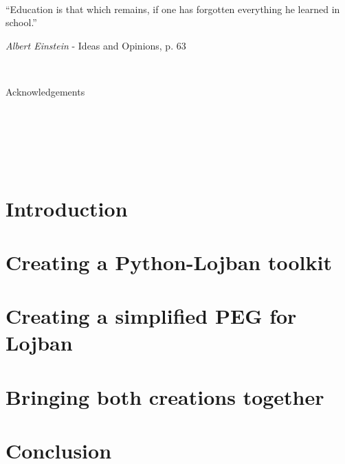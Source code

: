 

\newpage \ \newpage

\renewcommand{\epigraphsize}{\large}
\renewcommand{\epigraphwidth}{10cm}
\vspace{3cm}
\epigraph{``Education is that which remains, if one has forgotten everything he learned in school.''}{\textit{Albert Einstein} - Ideas and Opinions, p. 63}

\newpage \ \newpage

Acknowledgements

\newpage \ \newpage

\vspace{-1cm}
\setcounter{tocdepth}{3}
\tableofcontents
\newpage \ \newpage
\listoffigures
\newpage \ \newpage %

\makeatletter
\@openrightfalse
\makeatother
\pagestyle{fancy}
\part{Introduction}


\part{Creating a Python-Lojban toolkit}

\part{Creating a simplified PEG for Lojban}

\part{Bringing both creations together}


\part{Conclusion}


\newpage \ \newpage %


